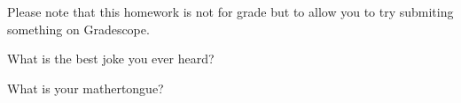 \documentclass[addpoints]{exam}
\begin{document}
  \pagestyle{headandfoot}
  \runningheadrule

  \firstpagefooter{}{}{}
  \runningfooter{}{}{}
  \begin{flushright}

    \vspace{0.2in}
  \end{flushright}

  \begin{questions}
    \begin{EnvFullwidth}
      Please note that this homework is not for grade but to allow you to
			try submiting something on Gradescope.
    \end{EnvFullwidth}
    \question[10]
      What is the best joke you ever heard?

      \begin{solution}[\stretch{1}]
      \end{solution}
      \newpage
    \question[10]
      What is your mathertongue?

      \begin{solution}[\stretch{1}]
      \end{solution}
      \newpage
  \end{questions}
\end{document}
